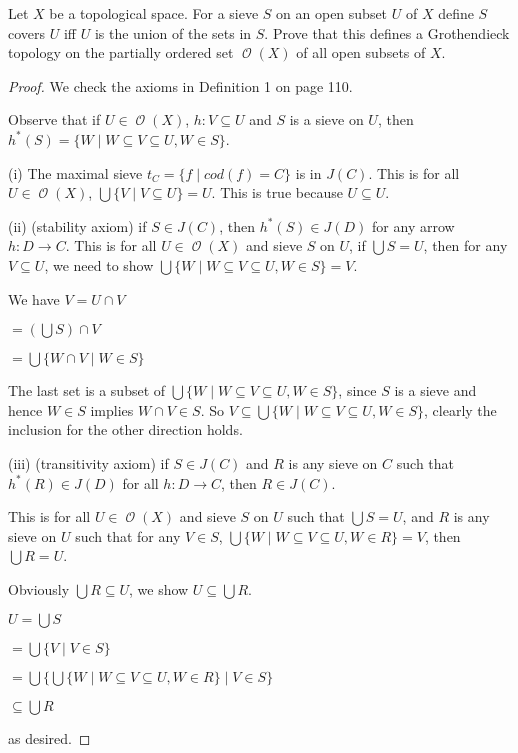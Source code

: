 \documentclass[a4paper]{article}
\title{\hmwkTitle}
\author{\textbf{\hmwkAuthorName}}
\date{\hmwkDueDate}
\DeclareMathOperator{\mcO}{\mathcal {O}}
\begin{document}
\begin{titlepage}
    \maketitle
\end{titlepage}

\begin{question}
    Let $X$ be a topological space. For a sieve $S$ on an open subset $U$ of $X$ define $S$ covers $U$ iff $U$ is the union of the sets in $S$. Prove that this defines a Grothendieck topology on the partially ordered set $\mcO (X)$ of all open subsets of $X$.
\end{question}
\begin{proof}
    We check the axioms in Definition 1 on page 110. \newline

    Observe that if $U\in \mcO (X)$, $h:V\subseteq U$ and $S$ is a sieve on $U$, then $h^*(S)=\{W\mid W\subseteq V \subseteq U,W\in S\}$. 


    (i) The maximal sieve $t_C=\{f\mid cod(f)= C\}$ is in $J(C)$.\newline
    This is for all $U\in \mcO (X)$, $\bigcup\{V\mid V\subseteq U\}=U$. This is true because $U\subseteq U$.

    (ii) (stability axiom) if $S\in J(C)$, then $h^*(S)\in J(D)$ for any arrow $h:D\to C$.\newline
    This is for all $U\in \mcO (X)$ and sieve $S$ on $U$, if $\bigcup S= U$, then for any $V\subseteq U$, we need to show $\bigcup \{W\mid W\subseteq V\subseteq U, W\in S\}= V$. 

    We have $V=U\cap V$

    $=(\bigcup S)\cap V$

    $= \bigcup \{W\cap V\mid W\in S\}$

    The last set is a subset of $\bigcup \{W\mid W\subseteq V\subseteq U, W\in S\}$, since $S$ is a sieve and hence $W\in S$ implies $W\cap V\in S$. So $V\subseteq \bigcup \{W\mid W\subseteq V\subseteq U, W\in S\}$, clearly the inclusion for the other direction holds. 

    (iii) (transitivity axiom) if $S\in J(C)$ and $R$ is any sieve on $C$ such that $h^*(R)\in J(D)$ for all $h:D\to C$, then $R\in J(C)$.

    This is for all $U\in \mcO (X)$ and sieve $S$ on $U$ such that $\bigcup S=U$, and $R$ is any sieve on $U$ such that for any $V\in S$, $\bigcup \{W\mid W\subseteq V\subseteq U,W\in R\}= V$, then $\bigcup R= U$. 

    Obviously $\bigcup R\subseteq U$, we show $U\subseteq \bigcup R$. 

    $U=\bigcup S$

    $=\bigcup \{V\mid V\in S\}$

    $= \bigcup \{\bigcup \{W\mid W\subseteq V \subseteq U,W\in R\}\mid V\in S\}$

    $\subseteq \bigcup R$

    as desired.
\end{proof}
\end{document}
